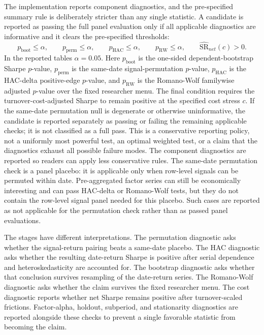 \documentclass[12pt,a4paper]{article}
\newcommand{\SR}{\mathrm{SR}}
\begin{document}
The implementation reports component diagnostics, and the pre-specified
summary rule is deliberately stricter than any single statistic.  A
candidate is reported as passing the full panel evaluation only if all
applicable diagnostics are informative and it clears the pre-specified
thresholds:
\[
  p_{\mathrm{boot}}\le \alpha,\qquad
  p_{\mathrm{perm}}\le \alpha,\qquad
  p_{\mathrm{HAC}}\le \alpha,\qquad
  p_{\mathrm{RW}}\le \alpha,\qquad
  \widehat{\SR}_{net}(c)>0 .
\]
In the reported tables \(\alpha=0.05\).  Here \(p_{\mathrm{boot}}\) is
the one-sided dependent-bootstrap Sharpe \(p\)-value,
\(p_{\mathrm{perm}}\) is the same-date signal-permutation \(p\)-value,
\(p_{\mathrm{HAC}}\) is the HAC-delta positive-edge \(p\)-value, and
\(p_{\mathrm{RW}}\) is the Romano-Wolf familywise adjusted \(p\)-value
over the fixed researcher menu.  The final condition requires the
turnover-cost-adjusted Sharpe to remain positive at the specified cost
stress \(c\).
If the same-date permutation null is degenerate or otherwise
uninformative, the candidate is reported separately as passing or failing
the remaining applicable checks; it is not classified as a full pass.
This is a conservative reporting policy, not a uniformly most powerful
test, an optimal weighted test, or a claim that the diagnostics exhaust
all possible failure modes.  The component diagnostics are reported so
readers can apply less conservative rules.
The same-date permutation check is a panel placebo: it is applicable only
when row-level signals can be permuted within date.  Pre-aggregated
factor series can still be economically interesting and can pass
HAC-delta or Romano-Wolf tests, but they do not contain the row-level
signal panel needed for this placebo.  Such cases are reported as not
applicable for the permutation check rather than as passed panel evaluations.

The stages have different interpretations.  The permutation diagnostic asks
whether the signal-return pairing beats a same-date placebo.  The HAC
diagnostic asks whether the resulting date-return Sharpe is positive after
serial dependence and heteroskedasticity are accounted for.  The
bootstrap diagnostic asks whether that conclusion survives resampling of
the date-return series.  The Romano-Wolf diagnostic asks whether the
claim survives the fixed researcher menu.  The cost diagnostic reports
whether net Sharpe remains positive after turnover-scaled frictions.
Factor-alpha, holdout, subperiod, and stationarity diagnostics are
reported alongside these checks to prevent a single favorable statistic
from becoming the claim.
\end{document}
